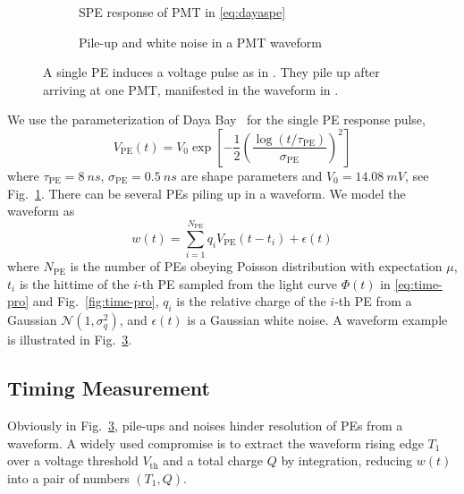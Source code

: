 \begin{figure}[H]
  \begin{subfigure}{.49\textwidth}
    \centering
    \resizebox{\textwidth}{!}{}
    \caption{\label{fig:spe} SPE response of PMT in \eqref{eq:dayaspe}}
  \end{subfigure}
  \begin{subfigure}{.49\textwidth}
    \centering
    \resizebox{\textwidth}{!}{}
    \caption{\label{fig:pile} Pile-up and white noise in a PMT waveform}
  \end{subfigure}
  \caption{A single PE induces a voltage pulse as in .  They pile up after arriving at one PMT, manifested in the waveform in .}
\end{figure}

We use the parameterization of Daya Bay~\cite{jetter_pmt_2012} for the single PE response pulse,
\begin{equation}
  V_\mathrm{PE}(t) = V_{0}\exp\left[-\frac{1}{2}\left(\frac{\log(t/\tau_\mathrm{PE})}{\sigma_\mathrm{PE}}\right)^{2}\right]
  \label{eq:dayaspe}
\end{equation}
where $\tau_\mathrm{PE}=\SI{8}{ns}$, $\sigma_\mathrm{PE}=\SI{0.5}{ns}$ are shape parameters and $V_{0}=\SI{14.08}{mV}$, see Fig.~\ref{fig:spe}.  There can be several PEs piling up in a waveform.  We model the waveform as
\begin{equation}
  \label{eq:1}
  w(t) = \sum_{i=1}^{N_\mathrm{PE}} q_i V_\mathrm{PE}(t-t_i) + \epsilon(t)
\end{equation}
where $N_\mathrm{PE}$ is the number of PEs obeying Poisson distribution with expectation $\mu$, $t_i$ is the hittime of the $i$-th PE sampled from the light curve $\Phi(t)$ in \eqref{eq:time-pro} and Fig.~\ref{fig:time-pro}, $q_i$ is the relative charge of the $i$-th PE from a Gaussian $\mathcal{N}(1,\sigma_{q}^2)$, and $\epsilon(t)$ is a Gaussian white noise.  A waveform example is illustrated in Fig.~\ref{fig:pile}.

\subsection{Timing Measurement}
Obviously in Fig.~\ref{fig:pile}, pile-ups and noises hinder resolution of PEs from a waveform.  A widely used compromise is to extract the waveform rising edge $T_1$ over a voltage threshold $V_\mathrm{th}$ and a total charge $Q$ by integration, reducing $w(t)$ into a pair of numbers $(T_1, Q)$.

